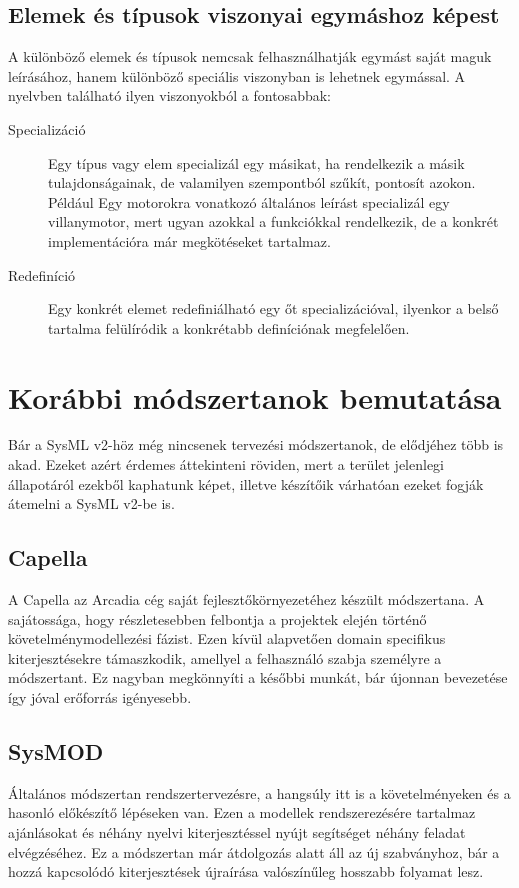     \subsection{Elemek és típusok viszonyai egymáshoz képest}
    A különböző elemek és típusok nemcsak felhasználhatják egymást saját maguk leírásához, hanem különböző speciális viszonyban is lehetnek egymással.
    A nyelvben található ilyen viszonyokból a fontosabbak:
    \begin{description}
        \item[Specializáció] Egy típus vagy elem specializál egy másikat, ha rendelkezik a másik tulajdonságainak, de valamilyen szempontból szűkít, pontosít azokon. Például Egy motorokra vonatkozó általános leírást specializál egy villanymotor, mert ugyan azokkal a funkciókkal rendelkezik, de a konkrét implementációra már megkötéseket tartalmaz.
        \item[Redefiníció] Egy konkrét elemet redefiniálható egy őt specializációval, ilyenkor a belső tartalma felülíródik a konkrétabb definíciónak megfelelően.
    \end{description}

\section{Korábbi módszertanok bemutatása}
Bár a SysML v2-höz még nincsenek tervezési módszertanok, de elődjéhez több is akad.
Ezeket azért érdemes áttekinteni röviden, mert a terület jelenlegi állapotáról ezekből kaphatunk képet, illetve készítőik várhatóan ezeket fogják átemelni a SysML v2-be is.

    \subsection{Capella} \cite{Capella2024}
    A Capella az Arcadia cég saját fejlesztőkörnyezetéhez készült módszertana. A sajátossága, hogy részletesebben felbontja a projektek elején történő követelménymodellezési fázist.
    Ezen kívül alapvetően domain specifikus kiterjesztésekre támaszkodik, amellyel a felhasználó szabja személyre a módszertant. Ez nagyban megkönnyíti a későbbi munkát, bár újonnan bevezetése így jóval erőforrás igényesebb.

    \subsection{SysMOD} \cite{Weilkiens2020}
    Általános módszertan rendszertervezésre, a hangsúly itt is a követelményeken és a hasonló előkészítő lépéseken van.
    Ezen a modellek rendszerezésére tartalmaz ajánlásokat és néhány nyelvi kiterjesztéssel nyújt segítséget néhány feladat elvégzéséhez.
    Ez a módszertan már átdolgozás alatt áll az új szabványhoz, bár a hozzá kapcsolódó kiterjesztések újraírása valószínűleg hosszabb folyamat lesz.

